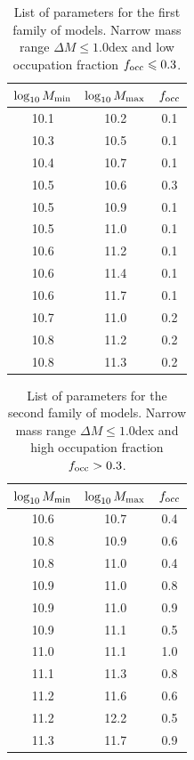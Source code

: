\documentclass[usenatbib]{mn2e}
\begin{document}
\begin{table}
\begin{center}
\begin{tabular}{ccc}\hline\hline
$\log_{10}M_{\rm min}$ & $\log_{10}M_{\rm max}$ & $f_{\rm occ}$\\\hline
10.1 &10.2 & 0.1\\
10.3 &10.5 & 0.1\\
10.4 &10.7 & 0.1\\
10.5 &10.6 & 0.3\\
10.5 &10.9 & 0.1\\
10.5 &11.0 & 0.1\\
10.6 &11.2 & 0.1\\
10.6 &11.4 & 0.1\\
10.6 &11.7 & 0.1\\
10.7 &11.0 & 0.2\\
10.8 &11.2 & 0.2\\
10.8 &11.3 & 0.2\\\hline
\end{tabular}
\end{center}
\caption{\label{table:firstfamily}List of parameters for the first
  family of models. Narrow mass range $\Delta M\leq 1.0$dex and low
  occupation fraction $f_{\rm occ}\leq 0.3$.} 
\end{table}



\begin{table}
\begin{center}
\begin{tabular}{ccc}\hline\hline
$\log_{10}M_{\rm min}$ & $\log_{10}M_{\rm max}$ & $f_{\rm occ}$\\\hline
10.6 &10.7 &0.4\\
10.8 &10.9 &0.6\\
10.8 &11.0 &0.4\\
10.9 &11.0 &0.8\\
10.9 &11.0 &0.9\\
10.9 &11.1 &0.5\\
11.0 &11.1 &1.0\\
11.1 &11.3 &0.8\\
11.2 &11.6 &0.6\\
11.2 &12.2 &0.5\\
11.3 &11.7 &0.9\\\hline
\end{tabular}
\end{center}
\caption{\label{table:secondfamily}List of parameters for the second
  family of models. Narrow mass range $\Delta M\leq 1.0$dex and high occupation fraction $f_{\rm occ}>0.3$.}
\end{table}




 
\end{document}
